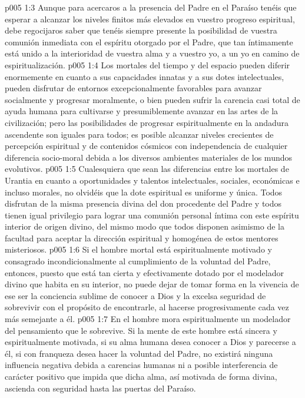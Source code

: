 \vs p005 1:3 \pc Aunque para acercaros a la presencia del Padre en el Paraíso tenéis que esperar a alcanzar los niveles finitos más elevados en vuestro progreso espiritual, debe regocijaros saber que tenéis siempre presente la posibilidad de vuestra comunión inmediata con el espíritu otorgado por el Padre, que tan íntimamente está unido a la interioridad de vuestra alma y a vuestro yo, a un yo en camino de espiritualización.
\vs p005 1:4 Los mortales del tiempo y del espacio pueden diferir enormemente en cuanto a sus capacidades innatas y a sus dotes intelectuales, pueden disfrutar de entornos excepcionalmente favorables para avanzar socialmente y progresar moralmente, o bien pueden sufrir la carencia casi total de ayuda humana para cultivarse y presumiblemente avanzar en las artes de la civilización; pero las posibilidades de progresar espiritualmente en la andadura ascendente son iguales para todos; es posible alcanzar niveles crecientes de percepción espiritual y de contenidos cósmicos con independencia de cualquier diferencia socio\hyp{}moral debida a los diversos ambientes materiales de los mundos evolutivos.
\vs p005 1:5 Cualesquiera que sean las diferencias entre los mortales de Urantia en cuanto a oportunidades y talentos intelectuales, sociales, económicas e incluso morales, no olvidéis que la dote espiritual es uniforme y única. Todos disfrutan de la misma presencia divina del don procedente del Padre y todos tienen igual privilegio para lograr una comunión personal íntima con este espíritu interior de origen divino, del mismo modo que todos disponen asimismo de la facultad para aceptar la dirección espiritual y homogénea de estos mentores misteriosos.
\vs p005 1:6 \pc Si el hombre mortal está espiritualmente motivado y consagrado incondicionalmente al cumplimiento de la voluntad del Padre, entonces, puesto que está tan cierta y efectivamente dotado por el modelador divino que habita en su interior, no puede dejar de tomar forma en la vivencia de ese ser la conciencia sublime de conocer a Dios y la excelsa seguridad de sobrevivir con el propósito de encontrarle, al hacerse progresivamente cada vez más semejante a él.
\vs p005 1:7 En el hombre mora espiritualmente un modelador del pensamiento que le sobrevive. Si la mente de este hombre está sincera y espiritualmente motivada, si su alma humana desea conocer a Dios y parecerse a él, si con franqueza desea hacer la voluntad del Padre, no existirá ninguna influencia negativa debida a carencias humanas ni a posible interferencia de carácter positivo que impida que dicha alma, así motivada de forma divina, ascienda con seguridad hasta las puertas del Paraíso.
